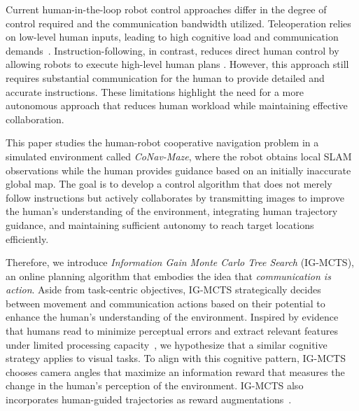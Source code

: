 Current human-in-the-loop robot control approaches differ in the degree of control required and the communication bandwidth utilized. Teleoperation relies on low-level human inputs, leading to high cognitive load and communication demands~\cite{moniruzzaman2022teleoperation}. Instruction-following, in contrast, reduces direct human control by allowing robots to execute high-level human plans \cite{anderson2018vision}. However, this approach still requires substantial communication for the human to provide detailed and accurate instructions. These limitations highlight the need for a more autonomous approach that reduces human workload while maintaining effective collaboration.


This paper studies the human-robot cooperative navigation problem in a simulated environment called \emph{CoNav-Maze}, where the robot obtains local SLAM observations while the human provides guidance based on an initially inaccurate global map. The goal is to develop a control algorithm that does not merely follow instructions but actively collaborates by transmitting images to improve the human's understanding of the environment, integrating human trajectory guidance, and maintaining sufficient autonomy to reach target locations efficiently.

Therefore, we introduce \emph{Information Gain Monte Carlo Tree Search} (IG-MCTS), an online planning algorithm that embodies the idea that \emph{communication is action}. Aside from task-centric objectives, IG-MCTS strategically decides between movement and communication actions based on their potential to enhance the human’s understanding of the environment.
Inspired by evidence that humans read to minimize perceptual errors and extract relevant features under limited processing capacity~\cite{kangassalo2020information}, we hypothesize that a similar cognitive strategy applies to visual tasks.
To align with this cognitive pattern, IG-MCTS chooses camera angles that maximize an information reward that measures the change in the human's perception of the environment.
IG-MCTS also incorporates human-guided trajectories as reward augmentations~\cite{chen2025human}.


